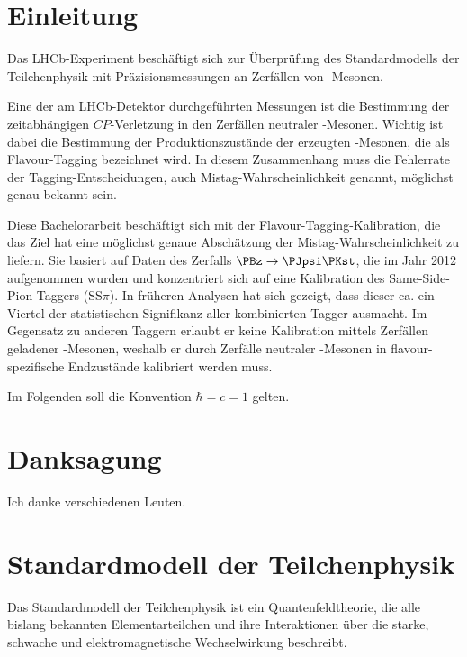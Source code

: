 \newcommand{\difference}[1]{\mathrm{\Delta} #1}

\section{Einleitung}

Das LHCb-Experiment beschäftigt sich zur Überprüfung des Standardmodells der Teilchenphysik mit Präzisionsmessungen an Zerfällen von \PB-Mesonen.

Eine der am LHCb-Detektor durchgeführten Messungen ist die Bestimmung der zeitabhängigen $CP$-Verletzung in den Zerfällen neutraler \PB-Mesonen.
Wichtig ist dabei die Bestimmung der Produktionszustände der erzeugten \PB-Mesonen, die als Flavour-Tagging bezeichnet wird.
In diesem Zusammenhang muss die Fehlerrate der Tagging-Entscheidungen, auch Mistag-Wahrscheinlichkeit genannt, möglichst genau bekannt sein.

Diese Bachelorarbeit beschäftigt sich mit der Flavour-Tagging-Kalibration, die das Ziel hat eine möglichst genaue Abschätzung der Mistag-Wahrscheinlichkeit zu liefern.
Sie basiert auf Daten des Zerfalls $\PBz \to \PJpsi\PKst$, die im Jahr 2012 aufgenommen wurden und konzentriert sich auf eine Kalibration des Same-Side-Pion-Taggers (SS$π$).
In früheren Analysen hat sich gezeigt, dass dieser ca. ein Viertel der statistischen Signifikanz aller kombinierten Tagger ausmacht.
Im Gegensatz zu anderen Taggern erlaubt er keine Kalibration mittels Zerfällen geladener \PB-Mesonen, weshalb er durch Zerfälle neutraler \PB-Mesonen in flavour-spezifische Endzustände kalibriert werden muss.

Im Folgenden soll die Konvention $\hbar = c = 1$ gelten.

\newpage

\section*{Danksagung}

Ich danke verschiedenen Leuten.

\newpage


\section{Standardmodell der Teilchenphysik}
\label{standard-model}

Das Standardmodell der Teilchenphysik ist ein Quantenfeldtheorie, die alle bislang bekannten Elementarteilchen und ihre Interaktionen über die starke, schwache und elektromagnetische Wechselwirkung beschreibt.

